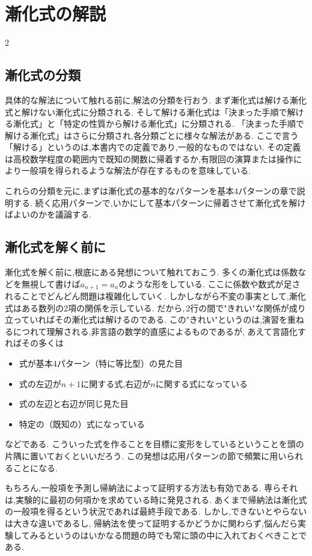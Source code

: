 \documentclass[dvipdfmx,a4paper,11pt,fleqn,openany]{jsbook}
\begin{document}
\chapter{漸化式の解説}
\begin{multicols*}{2}
  \section{漸化式の分類}
    具体的な解法について触れる前に,解法の分類を行おう.
    まず漸化式は解ける漸化式と解けない漸化式に分類される.
    そして解ける漸化式は「決まった手順で解ける漸化式」と「特定の性質から解ける漸化式」に分類される.
    「決まった手順で解ける漸化式」はさらに分類され,各分類ごとに様々な解法がある.
    ここで言う「解ける」というのは,本書内での定義であり,一般的なものではない.
    その定義は高校数学程度の範囲内で既知の関数に帰着するか,有限回の演算または操作により一般項を得られるような解法が存在するものを意味している.

    これらの分類を元に,まずは漸化式の基本的なパターンを基本4パターンの章で説明する.
    続く応用パターンで,いかにして基本パターンに帰着させて漸化式を解けばよいのかを議論する.

  \section{漸化式を解く前に}\label{sec:before}
    漸化式を解く前に,根底にある発想について触れておこう.
    多くの漸化式は係数などを無視して書けば$a_{n+1}=a_n$のような形をしている.
    ここに係数や数式が足されることでどんどん問題は複雑化していく.
    しかしながら不変の事実として,漸化式はある数列の2項の関係を示している.
    だから,\,2行の間で"きれい"な関係が成り立っていればその漸化式は解けるのである.
    この"きれい"というのは,演習を重ねるにつれて理解される,非言語の数学的直感によるものであるが,
    あえて言語化すればその多くは
    \begin{itemize}
      \item 式が基本4パターン（特に等比型）の見た目
      \item 式の左辺が$n+1$に関する式,右辺が$n$に関する式になっている
      \item 式の左辺と右辺が同じ見た目
      \item 特定の（既知の）式になっている
    \end{itemize}
    などである.
    こういった式を作ることを目標に変形をしているということを頭の片隅に置いておくといいだろう.
    この発想は応用パターンの節で頻繁に用いられることになる.

    もちろん,一般項を予測し帰納法によって証明する方法も有効である.
    専らそれは,実験的に最初の何項かを求めている時に発見される.
    あくまで帰納法は漸化式の一般項を得るという状況であれば最終手段である.
    しかし,できないとやらないは大きな違いであるし,
    帰納法を使って証明するかどうかに関わらず,悩んだら実験してみるというのはいかなる問題の時でも常に頭の中に入れておくべきことである.

\end{multicols*}
\end{document}
